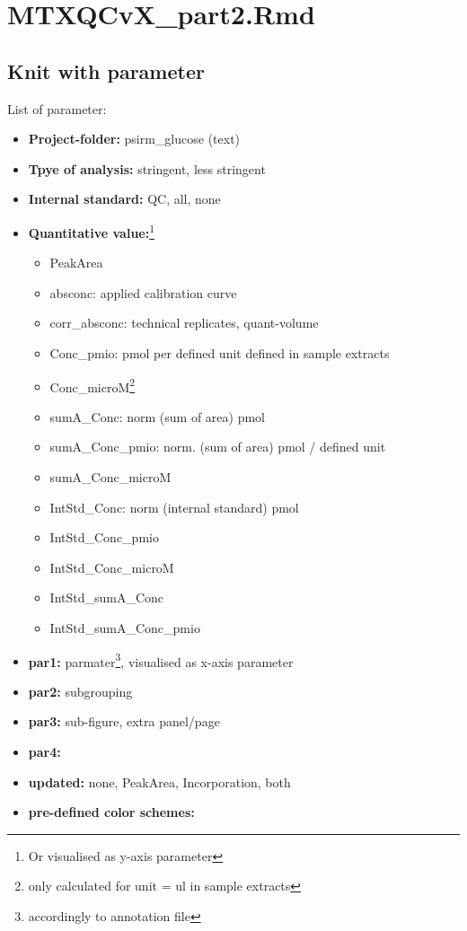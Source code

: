 \documentclass[]{book}
\providecommand{\tightlist}{%
  \setlength{\itemsep}{0pt}\setlength{\parskip}{0pt}}
\let\rmarkdownfootnote\footnote%
\def\footnote{\protect\rmarkdownfootnote}
\theoremstyle{definition}
\theoremstyle{definition}
\theoremstyle{definition}
\theoremstyle{remark}
\begin{document}
\chapter{MTXQCvX\_part2.Rmd}\label{part2}

\section{Knit with parameter}\label{knit-with-parameter-3}

List of parameter:

\begin{itemize}
\tightlist
\item
  \textbf{Project-folder:} psirm\_glucose (text)
\item
  \textbf{Tpye of analysis:} stringent, less stringent
\item
  \textbf{Internal standard:} QC, all, none
\item
  \textbf{Quantitative value:}\footnote{Or visualised as y-axis
    parameter}

  \begin{itemize}
  \tightlist
  \item
    PeakArea
  \item
    absconc: applied calibration curve
  \item
    corr\_absconc: technical replicates, quant-volume
  \item
    Conc\_pmio: pmol per defined unit defined in sample extracts
  \item
    Conc\_microM\footnote{only calculated for unit = ul in sample
      extracts}
  \item
    sumA\_Conc: norm (sum of area) pmol
  \item
    sumA\_Conc\_pmio: norm. (sum of area) pmol / defined unit
  \item
    sumA\_Conc\_microM
  \item
    IntStd\_Conc: norm (internal standard) pmol
  \item
    IntStd\_Conc\_pmio
  \item
    IntStd\_Conc\_microM
  \item
    IntStd\_sumA\_Conc
  \item
    IntStd\_sumA\_Conc\_pmio
  \end{itemize}
\item
  \textbf{par1:} parmater\footnote{accordingly to annotation file},
  visualised as x-axis parameter
\item
  \textbf{par2:} subgrouping
\item
  \textbf{par3:} sub-figure, extra panel/page
\item
  \textbf{par4:}
\item
  \textbf{updated:} none, PeakArea, Incorporation, both
\item
  \textbf{pre-defined color schemes:}


\end{itemize}
\end{document}
